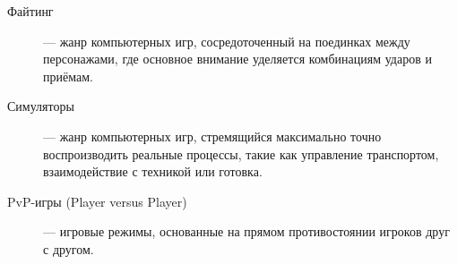 \begin{description}
    \item[Файтинг] --- жанр компьютерных игр, сосредоточенный на поединках между персонажами, где основное 
    внимание уделяется комбинациям ударов и приёмам.

    \item[Симуляторы] --- жанр компьютерных игр, стремящийся максимально точно воспроизводить реальные 
    процессы, такие как управление транспортом, взаимодействие с техникой или готовка.

    \item[PvP-игры (Player versus Player)] --- игровые режимы, основанные на прямом 
    противостоянии игроков друг с другом.

\end{description}

